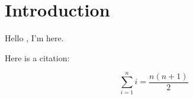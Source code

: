 
\section{Introduction}

Hello , I'm here.

Here is a citation: \parencite{shannon-1948-mathematical}

\[
\sum_{i=1}^{n} i = \frac{n(n+1)}{2}
\]





